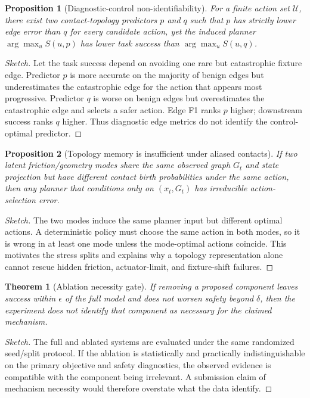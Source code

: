 \documentclass{article}
\newtheorem{proposition}{Proposition}
\newtheorem{theorem}{Theorem}
\begin{document}
\begin{proposition}[Diagnostic-control non-identifiability]
For a finite action set $\mathcal{U}$, there exist two contact-topology predictors $p$ and $q$ such that $p$ has strictly lower edge error than $q$ for every candidate action, yet the induced planner $\arg\max_u S(u,p)$ has lower task success than $\arg\max_u S(u,q)$.
\end{proposition}
\begin{proof}[Sketch]
Let the task success depend on avoiding one rare but catastrophic fixture edge. Predictor $p$ is more accurate on the majority of benign edges but underestimates the catastrophic edge for the action that appears most progressive. Predictor $q$ is worse on benign edges but overestimates the catastrophic edge and selects a safer action. Edge F1 ranks $p$ higher; downstream success ranks $q$ higher. Thus diagnostic edge metrics do not identify the control-optimal predictor.
\end{proof}

\begin{proposition}[Topology memory is insufficient under aliased contacts]
If two latent friction/geometry modes share the same observed graph $G_t$ and state projection but have different contact birth probabilities under the same action, then any planner that conditions only on $(x_t,G_t)$ has irreducible action-selection error.
\end{proposition}
\begin{proof}[Sketch]
The two modes induce the same planner input but different optimal actions. A deterministic policy must choose the same action in both modes, so it is wrong in at least one mode unless the mode-optimal actions coincide. This motivates the stress splits and explains why a topology representation alone cannot rescue hidden friction, actuator-limit, and fixture-shift failures.
\end{proof}

\begin{theorem}[Ablation necessity gate]
If removing a proposed component leaves success within $\epsilon$ of the full model and does not worsen safety beyond $\delta$, then the experiment does not identify that component as necessary for the claimed mechanism.
\end{theorem}
\begin{proof}[Sketch]
The full and ablated systems are evaluated under the same randomized seed/split protocol. If the ablation is statistically and practically indistinguishable on the primary objective and safety diagnostics, the observed evidence is compatible with the component being irrelevant. A submission claim of mechanism necessity would therefore overstate what the data identify.
\end{proof}
\end{document}
